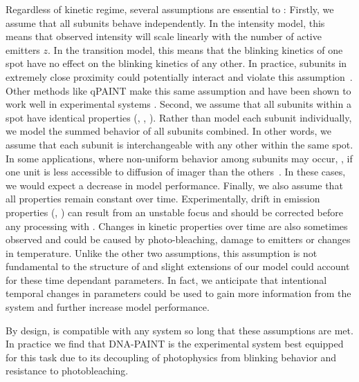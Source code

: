 Regardless of kinetic regime, several assumptions are essential to \ours:
  Firstly, we assume that all subunits behave independently.
  In the intensity model, this means that observed intensity will scale
  linearly with the number of active emitters $z$.
  In the transition model, this means that the blinking kinetics of one spot
  have no effect on the blinking kinetics of any other.
  In practice, subunits in extremely close proximity could
  potentially interact and violate this assumption~\citep{helmerich_photoswitching_2022}. 
  Other methods like qPAINT make this same assumption and have been shown to
  work well in experimental systems \citep{fischer_quantitative_2021,
  jayasinghe_true_2018}. 
  Second, we assume that all subunits within a spot have identical properties
  (\pon, \poff, \re).
  Rather than model each subunit individually, we model the summed behavior
  of all subunits combined. 
  In other words, we assume that each subunit is
  interchangeable with any other within the same spot.
  In some applications, where non-uniform behavior among subunits may occur, \eg,
  if one unit is less accessible to diffusion of
  imager than the others~\citep{civitci_2020}. 
  In these cases, we would expect a decrease in model performance.
  Finally, we also assume that all properties remain constant over time. 
  Experimentally, drift in emission properties (\re, \rb) can result from 
  an unstable focus and should be corrected before any processing with
  \ours.
  Changes in kinetic properties over time are also sometimes observed and could
  be caused by photo-bleaching, damage to emitters or changes in temperature. 
  Unlike the other two assumptions, this assumption is not fundamental to the
  structure of \ours and slight extensions of our model could account for these
  time dependant parameters.
  In fact, we anticipate that intentional temporal changes in parameters could be used to gain more
  information from the system and further increase model performance.

By design, \ours is compatible with any
system so long that these assumptions are met.
  In practice we find that DNA-PAINT is the experimental system best equipped for this task 
  due to its decoupling of photophysics from blinking behavior and resistance to photobleaching. 

